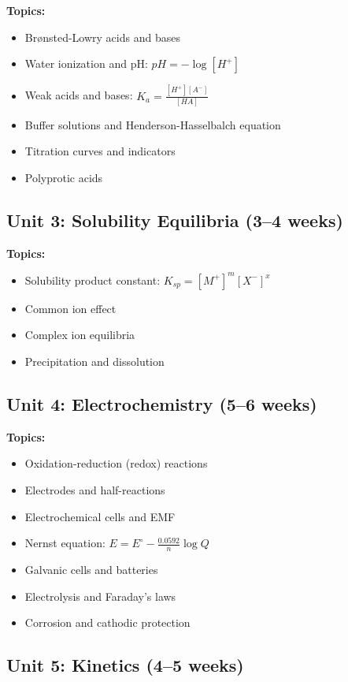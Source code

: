 \documentclass[12pt,oneside]{book}
\begin{document}
\textbf{Topics:}
\begin{itemize}
    \item Brønsted-Lowry acids and bases
    \item Water ionization and pH: $pH = -\log[H^+]$
    \item Weak acids and bases: $K_a = \frac{[H^+][A^-]}{[HA]}$
    \item Buffer solutions and Henderson-Hasselbalch equation
    \item Titration curves and indicators
    \item Polyprotic acids
\end{itemize}

\subsection{Unit 3: Solubility Equilibria (3--4 weeks)}

\textbf{Topics:}
\begin{itemize}
    \item Solubility product constant: $K_{sp} = [M^+]^m[X^-]^x$
    \item Common ion effect
    \item Complex ion equilibria
    \item Precipitation and dissolution
\end{itemize}

\subsection{Unit 4: Electrochemistry (5--6 weeks)}

\textbf{Topics:}
\begin{itemize}
    \item Oxidation-reduction (redox) reactions
    \item Electrodes and half-reactions
    \item Electrochemical cells and EMF
    \item Nernst equation: $E = E^\circ - \frac{0.0592}{n}\log Q$
    \item Galvanic cells and batteries
    \item Electrolysis and Faraday's laws
    \item Corrosion and cathodic protection
\end{itemize}

\subsection{Unit 5: Kinetics (4--5 weeks)}
\end{document}
